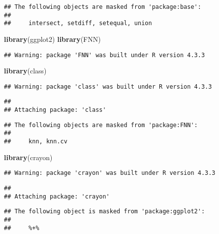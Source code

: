 \documentclass[
]{article}
\newenvironment{Shaded}{\begin{snugshade}}{\end{snugshade}}
\newcommand{\FunctionTok}[1]{\textcolor[rgb]{0.13,0.29,0.53}{\textbf{#1}}}
\newcommand{\NormalTok}[1]{#1}
\begin{document}
\begin{verbatim}
## The following objects are masked from 'package:base':
## 
##     intersect, setdiff, setequal, union
\end{verbatim}

\begin{Shaded}
\begin{Highlighting}[]
\FunctionTok{library}\NormalTok{(ggplot2)}
\FunctionTok{library}\NormalTok{(FNN)}
\end{Highlighting}
\end{Shaded}

\begin{verbatim}
## Warning: package 'FNN' was built under R version 4.3.3
\end{verbatim}

\begin{Shaded}
\begin{Highlighting}[]
\FunctionTok{library}\NormalTok{(class)}
\end{Highlighting}
\end{Shaded}

\begin{verbatim}
## Warning: package 'class' was built under R version 4.3.3
\end{verbatim}

\begin{verbatim}
## 
## Attaching package: 'class'
\end{verbatim}

\begin{verbatim}
## The following objects are masked from 'package:FNN':
## 
##     knn, knn.cv
\end{verbatim}

\begin{Shaded}
\begin{Highlighting}[]
\FunctionTok{library}\NormalTok{(crayon)}
\end{Highlighting}
\end{Shaded}

\begin{verbatim}
## Warning: package 'crayon' was built under R version 4.3.3
\end{verbatim}

\begin{verbatim}
## 
## Attaching package: 'crayon'
\end{verbatim}

\begin{verbatim}
## The following object is masked from 'package:ggplot2':
## 
##     %+%
\end{verbatim}
\end{document}
